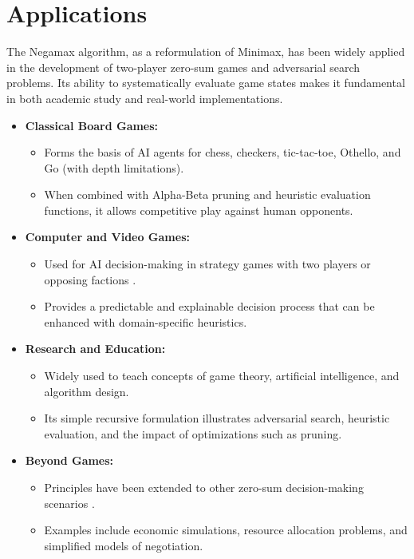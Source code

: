\documentclass{LSkill}  %
\begin{document}
\section{Applications}

The Negamax algorithm, as a reformulation of Minimax, has been widely applied in the development of 
two-player zero-sum games and adversarial search problems. Its ability to systematically evaluate 
game states makes it fundamental in both academic study and real-world implementations.

\begin{itemize}
    \item \textbf{Classical Board Games:} 
    \begin{itemize}
        \item Forms the basis of AI agents for chess, checkers, tic-tac-toe, Othello, and Go (with depth limitations). 
        \item When combined with Alpha-Beta pruning and heuristic evaluation functions, it allows competitive play against human opponents.
    \end{itemize}

    \item \textbf{Computer and Video Games:} 
    \begin{itemize}
        \item Used for AI decision-making in strategy games with two players or opposing factions \cite{viazovskyi2018staralgo}.
        \item Provides a predictable and explainable decision process that can be enhanced with domain-specific heuristics.
    \end{itemize}

    \item \textbf{Research and Education:} 
    \begin{itemize}
        \item Widely used to teach concepts of game theory, artificial intelligence, and algorithm design.
        \item Its simple recursive formulation illustrates adversarial search, heuristic evaluation, and the impact of optimizations such as pruning.
    \end{itemize}

    \item \textbf{Beyond Games:} 
    \begin{itemize}
        \item Principles have been extended to other zero-sum decision-making scenarios \cite{ai2020nonneural}.
        \item Examples include economic simulations, resource allocation problems, and simplified models of negotiation.
    \end{itemize}
\end{itemize}


   
   
\end{document}
